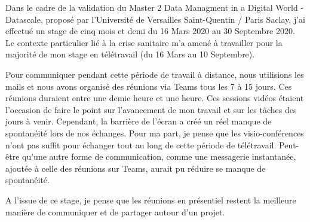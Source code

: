 \documentclass{article}
\begin{document}
Dans le cadre de la validation du Master 2 Data Managment in a Digital World - Datascale, proposé par l'Université de Versailles Saint-Quentin / Paris Saclay, j'ai effectué un stage de cinq mois et demi du 16 Mars 2020 au 30 Septembre 2020.
Le contexte particulier lié à la crise sanitaire m'a amené à travailler pour la majorité de mon stage en télétravail (du 16 Mars au 10 Septembre).\par
Pour communiquer pendant cette période de travail à distance, nous utilisions les mails et nous avons organisé des réunions via Teams tous les 7 à 15 jours.
Ces réunions duraient entre une demie heure et une heure.
Ces sessions vidéos étaient l'occasion de faire le point sur l'avancement de mon travail et sur les tâches des jours à venir.
Cependant, la barrière de l'écran a créé un réel manque de spontanéité lors de nos échanges.
Pour ma part, je pense que les visio-conférences n'ont pas suffit pour échanger tout au long de cette période de télétravail. 
Peut-être qu'une autre forme de communication, comme une messagerie instantanée, ajoutée à celle des réunions sur Teams, aurait pu réduire se manque de spontanéité.\par
A l'issue de ce stage, je pense que les réunions en présentiel restent la meilleure manière de communiquer et de partager autour d'un projet.

\newpage
\renewcommand{\contentsname}{Table des matières}\tableofcontents

\newpage
\end{document}
